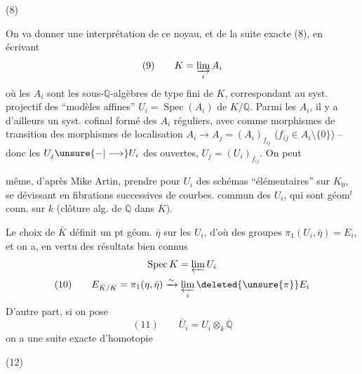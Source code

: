 \noindent (8)\quad{}

On va donner une interprétation de ce noyau, et de la suite exacte (8), en écrivant
\[
(9)\qquad K=\varinjlim_i A_i
\]
où les $A_i$ sont les sous-$\mathbb Q$-algèbres de type fini de $K$, correspondant au syst. projectif des ``modèles affines'' $U_i=\operatorname{Spec}(A_i)$ de $K/\mathbb Q$. Parmi les $A_i$, il y a d'ailleurs un syst. cofinal formé des $A_i$ réguliers,  avec comme morphismes de transition des morphismes de localisation $A_i\longrightarrow A_j=(A_i)_{f_{ij}}$ ($f_{ij}\in A_i\setminus\{0\}$) -- donc les $U_j\unsure{-|\longrightarrow}U_i$ des  ouvertes, $U_j=(U_i)_{f_{ij}}$. On peut

même, d'après Mike Artin, prendre pour $U_i$ des schémas ``élémentaires'' sur $K_0$, se dévissant en fibrations successives de courbes.   commun des $U_i$, qui sont géom$^t$ conn.  sur  $k$ (clôture alg. de $\mathbb Q$ dans $K$).

Le choix de $\bar K$ définit un pt géom. $\bar\eta$ sur les $U_i$, d'où des groupes $\pi_1(U_i,\bar\eta)=E_i$, et on a, en vertu des résultats bien connus
\[
\operatorname{Spec}K=\varprojlim U_i
\]
\[
(10)\qquad E_{\bar K/K}=\pi_1(\eta,\bar\eta)\xrightarrow{\sim}\varprojlim_i\deleted{\unsure{\pi}}E_i
\]
D'autre part, si on pose
\[
(11)\qquad\bar U_i=U_i\otimes_k\overline{\mathbb Q}
\]
on a  une suite exacte d'homotopie

\noindent (12)\quad{}

